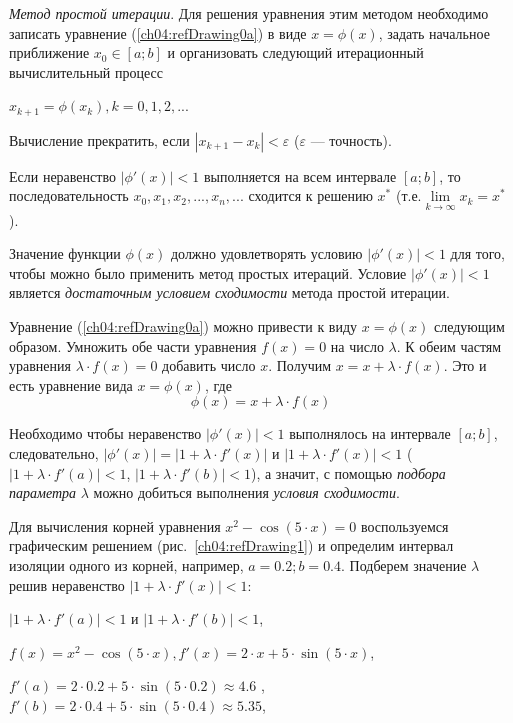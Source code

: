 \emph{Метод простой итерации}. Для решения уравнения этим методом необходимо записать уравнение
(\ref{ch04:refDrawing0a}) в виде  $x=\phi(x)$, задать начальное приближение  $x_0\in [a;b]$ и организовать следующий
итерационный вычислительный процесс 

$x_{k+1}=\phi(x_k),k=0,1,2,...$

Вычисление прекратить, если  $|x_{k+1}-x_k|<\varepsilon$
($\varepsilon$ --- точность).

Если неравенство  $|\phi'(x)|<1$ выполняется на всем интервале  $[a;b]$, то последовательность 
$x_0, x_1, x_2,...,x_n,...$ сходится к решению $x^*$ (т.е.$\lim\limits_{k\rightarrow \infty}x_k=x^*$).


Значение функции  $\phi(x)$  должно удовлетворять условию  $|\phi'(x)|<1$  для того, чтобы можно было применить метод
простых итераций. Условие  $|\phi'(x)|<1$  является
\emph{достаточным условием сходимости} метода простой итерации.

Уравнение (\ref{ch04:refDrawing0a}) можно привести к виду  $x=\phi(x)$ 
следующим образом. Умножить обе части уравнения  $f(x)=0$
на число  $\lambda$. К обеим частям уравнения  $\lambda\cdot f(x)=0$ добавить число $x$. Получим 
$x=x+\lambda\cdot f(x)$. Это и есть уравнение вида  $x=\phi(x)$, где 
\begin{equation}\label{ch04:refDrawing3a}
 \phi(x)=x+\lambda\cdot f(x)
\end{equation}

Необходимо чтобы неравенство  $|\phi'(x)|<1$ выполнялось на интервале  $[a;b]$, следовательно, 
$|\phi'(x)|=|1+\lambda\cdot f'(x)|$  и  $|1+\lambda\cdot f'(x)|<1$  ($|1+\lambda\cdot f'(a)|<1$,  $|1+\lambda\cdot
f'(b)|<1$), а значит, с помощью \emph{подбора параметра}  $\lambda$  можно добиться выполнения
\emph{условия сходимости}. 

Для вычисления корней уравнения  $x^2-\cos (5\cdot x)=0$  воспользуемся графическим 
решением (рис.~\ref{ch04:refDrawing1}) и
определим интервал изоляции одного из корней, например,  $a=0.2;b=0.4$. 
Подберем значение  $\lambda$  решив
неравенство  $|1+\lambda\cdot f'(x)|<1$:
 
$|1+\lambda\cdot f'(a)|<1$ и  $|1+\lambda\cdot f'(b)|<1$,

$f(x)=x^{2}-\cos (5\cdot x),f'(x)=2\cdot x+5\cdot \sin (5\cdot x)$,

$f'(a)=2\cdot 0.2+5\cdot \sin (5\cdot 0.2)\approx 4.6$ ,  $f'(b)=2\cdot 0.4+5\cdot \sin (5\cdot 0.4)\approx 5.35$,


